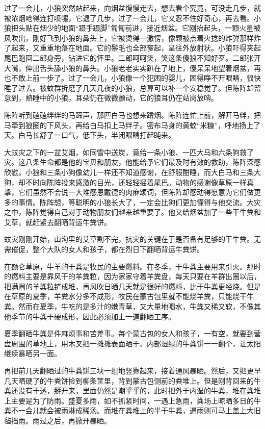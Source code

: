\par 过了一会儿，小狼突然站起来，向烟盆慢慢走去，想去看个究竟，可没走几步，就被浓烟呛得连打喷嚏，它退了几步，过了一会儿，它又忍不住好奇心，再去看。小狼把头贴在烟少的地面“蹑手蹑脚”匍匐前进，接近烟盆。它刚抬起头，一颗火星被风吹出，刚好飞到小狼的鼻头上，它被烫得一激愣，像颗被点着火捻的炸弹那样炸了起来，又重重地落在地面。它的鬃毛也全部奓起，呈往外放射状。小狼吓得夹起尾巴跑回二郎身旁，钻进它的怀里。二郎呵呵笑，笑这条傻狼不知好歹。二郎张开大嘴，伸出舌头舔小狼的鼻头。小狼老老实实趴在了地上，傻呆呆地望着烟盆，再也不敢上前一步了。过了一会儿，小狼像一个犯困的婴儿，困得睁不开眼睛，很快睡了过去。被蚊群折磨了几天几夜的小狼，总算可以补一个安稳觉了。但陈阵却留意到，熟睡中的小狼，耳朵仍在微微颤动，它的狼耳仍在站岗放哨。
\par 陈阵听到磕磕绊绊的马蹄声，那匹白马也想来蹭烟。陈阵连忙上前，解开马绊，把马牵到狼圈的下风头，再给白马扣上马绊子。密布马身的黄蚊“米糠”，呼地扬上了天。白马长舒了一口气，低下头，半闭眼睛打起盹来。
\par 大蚊灾之下的一盆艾烟，如同雪中送炭，竟给一条小狼、一匹大马和六条狗救了灾。这八条生命都是他的宝贝和朋友，他能给予它们最及时有效的救助，陈阵深感欣慰。小狼和三条小狗像幼儿一样还不知道感谢，在舒服酣睡，而大白马和三条大狗，却不时向陈阵投来感激的目光，还轻轻摇着尾巴。动物的感谢像草原一样真挚，它们虽然不会说一大堆感恩戴德的肉麻颂词，但陈阵却感动得愿意为它们做更多的事情。陈阵想，等聪明的小狼长大了，一定会比狗们更加懂得与他交流。大灾之中，陈阵觉得自己对于动物朋友们越来越重要了。他又给烟盆加了一些干牛粪和艾草，就赶紧去翻晒背运牛粪饼。
\par 
\par 蚊灾刚刚开始，山沟里的艾草割不完，抗灾的关键在于是否备有足够的干牛粪。无需催促，整个大队的女人和孩子，都在烈日下翻晒背运牛粪饼。
\par 在额仑草原，牛羊的干粪是牧民的主要燃料。在冬季，干牛粪主要用来引火。那时的燃料主要是靠风干的羊粪粒，因为家家守着羊粪盘，每天只要在羊群出圈以后，把满圈的羊粪粒铲成堆，再风吹日晒几天就是很好的燃料，比干牛粪更经烧。但是在草原的夏季，羊粪水分多不成形，牧民在蒙古包里就不能烧羊粪，只能烧干牛粪。然而在夏季，牛吃的是多汁的嫩青草，又大量地喝水，牛粪又稀又软，不像其他季节的牛粪干硬成形，因此必须加上一道翻晒工序。
\par 夏季翻晒牛粪是件麻烦事和苦差事。每个蒙古包的女人和孩子，一有空，就要到营盘周围的草地上，用木叉把一摊摊表面晒干、内部湿绿的牛粪饼一一翻个，让太阳继续暴晒另一面。
\par 再把前几天翻晒过的牛粪饼三块一组地竖靠起来，接着通风暴晒。然后，又把更早几天晒硬了的牛粪饼捡到柳条筐里，背到蒙古包侧前的粪堆上。但是刚背回来的牛粪还没有干透，掰开来，里面仍然是潮乎乎的，此时把外干内湿的牛粪，堆在粪堆上主要是为了防雨。盛夏多雨，如不抓紧时间，一遇上急雨，粪场上晾晒多日的牛粪不一会儿就会被雨淋成稀汤。而堆在粪堆上的半干牛粪，遇雨则可马上盖上大旧毡挡雨。雨过之后，再掀开暴晒。

